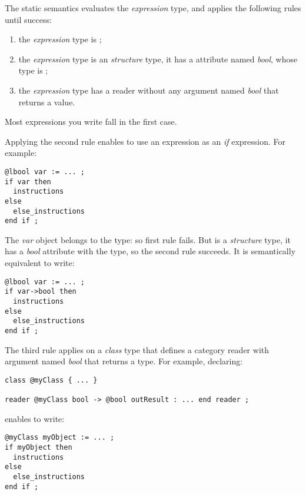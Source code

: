The static semantics evaluates the \emph{expression} type, and applies the following rules until success:
\begin{enumerate}
\item the \emph{expression} type is ;
\item the \emph{expression} type is an \emph{structure} type, it has a attribute named \emph{bool}, whose type is ;
\item the \emph{expression} type has a reader without any argument named \emph{bool} that returns a  value.
\end{enumerate}

Most expressions you write fall in the first case.

Applying the second rule enables to use an  expression as an \emph{if} expression. For example:
{
\begin{lstlisting}[language=galgas]
@lbool var := ... ;
if var then
  instructions
else
  else_instructions
end if ;
\end{lstlisting}
}

The \emph{var} object belongs to the  type: so first rule fails. But  is a \emph{structure} type, it has a \emph{bool} attribute with the  type, so the second rule succeeds. It is semantically equivalent to write:
{
\begin{lstlisting}[language=galgas]
@lbool var := ... ;
if var->bool then
  instructions
else
  else_instructions
end if ;
\end{lstlisting}
}

The third rule applies on a \emph{class} type that defines a category reader with argument named \emph{bool} that returns a  type. For example, declaring:
\begin{lstlisting}[language=galgas]
class @myClass { ... }

reader @myClass bool -> @bool outResult : ... end reader ;
\end{lstlisting}

enables to write:
{
\begin{lstlisting}[language=galgas]
@myClass myObject := ... ;
if myObject then
  instructions
else
  else_instructions
end if ;
\end{lstlisting}
}

